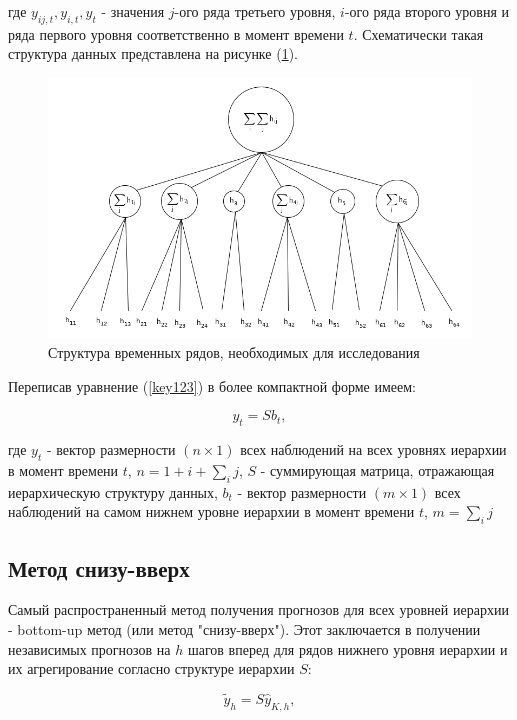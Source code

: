 \documentclass[12pt,a4paper, oneside]{extreport}
\begin{document}
\noindent
где $y_{ij,t}, y_{i,t},  y_{t}  $ - значения $j$-ого ряда третьего уровня, $i$-ого ряда второго уровня и ряда первого уровня соответственно в момент времени $t$. Схематически такая  структура данных представлена на рисунке (\ref{fig:screenshot51}).



\begin{figure}
	\centering
	\includegraphics[width=0.7\linewidth]{Screenshot51}
	\caption{Структура временных рядов, необходимых для исследования}
	\label{fig:screenshot51}
\end{figure}




Переписав уравнение (\ref{key123})  в более компактной форме имеем: 

\begin{equation}\label{key}
y_t  = S b_t ,
\end{equation}

\noindent
где $y_t$ - вектор размерности $(n \times 1)$ всех наблюдений на всех уровнях иерархии в момент времени $t$, $ n = 1+i+\sum_i j$, $S$  - суммирующая матрица, отражающая иерархическую структуру данных,  
$ b_t $ - вектор размерности $(m \times 1)$ всех наблюдений на самом нижнем уровне иерархии в момент времени $t$, $ m =\sum_i j$ 


\subsection{Метод снизу-вверх}

Самый распространенный метод получения прогнозов для всех уровней иерархии -  bottom-up метод (или метод "снизу-вверх"). Этот заключается в получении независимых прогнозов на $h$ шагов вперед  для рядов нижнего уровня иерархии  и  их агрегирование согласно структуре иерархии $S$: 

\begin{equation}\label{key}
\tilde{y}_h = S \hat{y}_{K,h}   ,
\end{equation}
\end{document}
